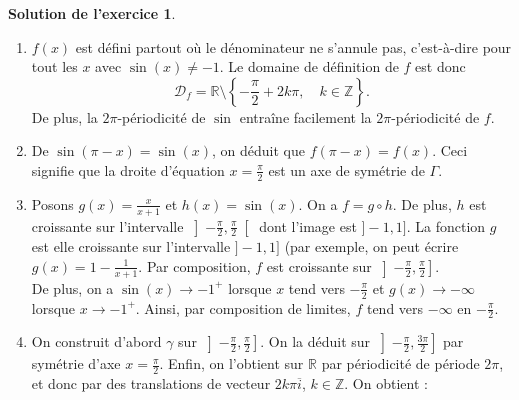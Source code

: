 \documentclass[a4paper, 11pt,openany]{article}%
\theoremstyle{plain}
\theoremstyle{definition}
\newtheorem{sol}{Solution de l'exercice}
\theoremstyle{remark}
\newcommand{\R}{\mathbb{R}}
\newcommand{\Z}{\mathbb{Z}}
\begin{document}
\begin{sol}
\begin{enumerate}
\item $f(x)$ est défini partout où le dénominateur ne s'annule pas, c'est-à-dire pour tout les $x$ avec $\sin(x) \neq -1$. Le domaine de définition de $f$ est donc 
\[ \mathcal{D}_f = \R \setminus \left\{ - \frac{\pi}{2} + 2 k\pi, \quad k \in \Z \right\}.\]
De plus, la $2\pi$-périodicité de $\sin$ entraîne facilement la $2\pi$-périodicité de $f$.
\item De $\sin(\pi-x)=\sin(x)$, on déduit que $f(\pi-x)=f(x)$. Ceci signifie que la droite d'équation $x= \frac{\pi}{2}$ est un axe de symétrie de $\Gamma$.
\item Posons $g(x)=\frac{x}{x+1}$ et $h(x)=\sin(x)$. On a $f=g \circ h$. De plus, $h$ est croissante sur l'intervalle $\left] - \frac{\pi}{2} , \frac{\pi}{2} \right[$ dont l'image est $]-1,1]$. La fonction $g$ est elle croissante sur l'intervalle $]-1,1]$ (par exemple, on peut écrire $g(x)=1-\frac{1}{x+1}$. Par composition, $f$ est croissante sur $\left] - \frac{\pi}{2}, \frac{\pi}{2} \right]$.\\
De plus, on a $\sin(x)\to -1^+$ lorsque $x$ tend vers $- \frac{\pi}{2}$ et $g(x) \to - \infty$ lorsque $x \to -1^+$. Ainsi, par composition de limites, $f$ tend vers $- \infty$ en $-\frac{\pi}{2}$.
\item On construit d'abord $\gamma$ sur $\left] - \frac{\pi}{2} , \frac{\pi}{2} \right]$. On la déduit sur $\left] - \frac{\pi}{2} , \frac{3\pi}{2} \right]$ par symétrie d'axe $x= \frac{\pi}{2}$. Enfin, on l'obtient sur $\R$ par périodicité de période $2 \pi$, et donc par des translations de vecteur $2 k \pi \overline{i}$, 
$k \in \Z$. On obtient :
\begin{center}
    \end{center}
\end{enumerate}


\end{sol}
\end{document}
